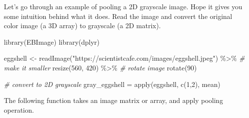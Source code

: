 \documentclass[
  12pt,
]{krantz}
\makeatletter
\newenvironment{Shaded}{\begin{snugshade}}{\end{snugshade}}
\newcommand{\CommentTok}[1]{\textcolor[rgb]{0.37,0.37,0.37}{\textit{#1}}}
\newcommand{\DecValTok}[1]{\textcolor[rgb]{0.06,0.06,0.06}{#1}}
\newcommand{\FunctionTok}[1]{\textcolor[rgb]{0,0,0}{#1}}
\newcommand{\NormalTok}[1]{#1}
\newcommand{\OtherTok}[1]{\textcolor[rgb]{0.37,0.37,0.37}{#1}}
\newcommand{\SpecialCharTok}[1]{\textcolor[rgb]{0,0,0}{#1}}
\newcommand{\StringTok}[1]{\textcolor[rgb]{0.5,0.5,0.5}{#1}}
\newenvironment{kframe}{%
\medskip{}
\setlength{\fboxsep}{.8em}
 \def\at@end@of@kframe{}%
 \ifinner\ifhmode%
  \def\at@end@of@kframe{\end{minipage}}%
  \begin{minipage}{\columnwidth}%
 \fi\fi%
 \def\FrameCommand##1{\hskip\@totalleftmargin \hskip-\fboxsep
 \colorbox{shadecolor}{##1}\hskip-\fboxsep
     \hskip-\linewidth \hskip-\@totalleftmargin \hskip\columnwidth}%
 \MakeFramed {\advance\hsize-\width
   \@totalleftmargin\z@ \linewidth\hsize
   \@setminipage}}%
 {\par\unskip\endMakeFramed%
 \at@end@of@kframe}
\renewenvironment{Shaded}{\begin{kframe}}{\end{kframe}}
\makeatother
\begin{document}
Let's go through an example of pooling a 2D grayscale image. Hope it gives you some intuition behind what it does. Read the image and convert the original color image (a 3D array) to grayscale (a 2D matrix).

\begin{Shaded}
\begin{Highlighting}[]
\FunctionTok{library}\NormalTok{(EBImage)}
\FunctionTok{library}\NormalTok{(dplyr)}

\NormalTok{eggshell }\OtherTok{\textless{}{-}} \FunctionTok{readImage}\NormalTok{(}\StringTok{"https://scientistcafe.com/images/eggshell.jpeg"}\NormalTok{) }\SpecialCharTok{\%\textgreater{}\%}
  \CommentTok{\# make it smaller}
  \FunctionTok{resize}\NormalTok{(}\DecValTok{560}\NormalTok{, }\DecValTok{420}\NormalTok{) }\SpecialCharTok{\%\textgreater{}\%}
  \CommentTok{\# rotate image}
  \FunctionTok{rotate}\NormalTok{(}\DecValTok{90}\NormalTok{)}

\CommentTok{\# convert to 2D grayscale}
\NormalTok{gray\_eggshell }\OtherTok{=} \FunctionTok{apply}\NormalTok{(eggshell, }\FunctionTok{c}\NormalTok{(}\DecValTok{1}\NormalTok{,}\DecValTok{2}\NormalTok{), mean)}
\end{Highlighting}
\end{Shaded}

The following function takes an image matrix or array, and apply pooling operation.
\end{document}
